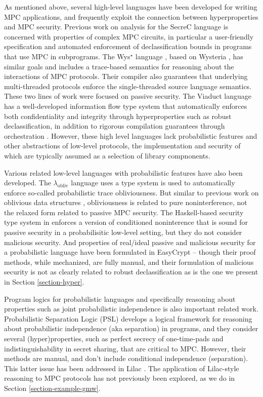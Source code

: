 As mentioned above, several high-level languages have been developed
for writing MPC applications, and frequently exploit the connection
between hyperproperties and MPC security. Previous work on analysis
for the SecreC language
\cite{almeida2018enforcing,10.1145/2637113.2637119} is concerned with
properties of complex MPC circuits, in particular a user-friendly
specification and automated enforcement of declassification bounds in
programs that use MPC in subprograms. The Wys$^\star$ language
\cite{wysstar}, based on Wysteria \cite{rastogi2014wysteria}, has
similar goals and includes a trace-based semantics for reasoning about
the interactions of MPC protocols. Their compiler also guarantees that
underlying multi-threaded protocols enforce the single-threaded source
language semantics. These two lines of work were focused on passive
security. The Viaduct language
\cite{10.1145/3453483.3454074} has a well-developed
information flow type system that automatically enforces both
confidentiality and integrity through hyperproperties such as robust
declassification, in addition to rigorous compilation guarantees
through orchestration \cite{viaduct-UC}. However, these high level
languages lack probabilistic features and other abstractions of
low-level protocols, the implementation and security of which are
typically assumed as a selection of library compnonents.

Various related low-level languages with probabilistic features have
also been developed. The $\lambda_{\mathrm{obliv}}$ language
\cite{darais2019language} uses a type system is used to automatically
enforce so-called probabilistic trace obliviousness.  But similar to
previous work on oblivious data structures \cite{10.1145/3498713},
obliviousness is related to pure noninterference, not the relaxed form
related to passive MPC security. The Haskell-based security type system in
\cite{6266151} enforces a version of conditioned noninterence that is
sound for passive security in a probabilisitic low-level setting, but
they do not consider malicious security. And properties of real/ideal
passive and malicious security for a probabilistic language have been
formulated in EasyCrypt \cite{8429300}-- though their proof methods,
while mechanized, are fully manual, and their formulation of malicious
security is not as clearly related to robust declassification as is the
one we present in Section \ref{section-hyper}. 

Program logics for probabilistic languages and specifically reasoning
about properties such as joint probabilistic independence is also
important related work. Probabilistic Separation Logic (PSL)
\cite{barthe2019probabilistic} develops a logical framework for
reasoning about probabilistic independence (aka separation) in
programs, and they consider several (hyper)properties, such as perfect
secrecy of one-time-pads and indistinguishability in secret sharing,
that are critical to MPC. However, their methods are manual, and
don't include conditional independence (separation). This
latter issue has been addressed in Lilac \cite{li2023lilac}. The
application of Lilac-style reasoning to MPC protocols has not
previously been explored, as we do in Section
\ref{section-example-gmw}.


